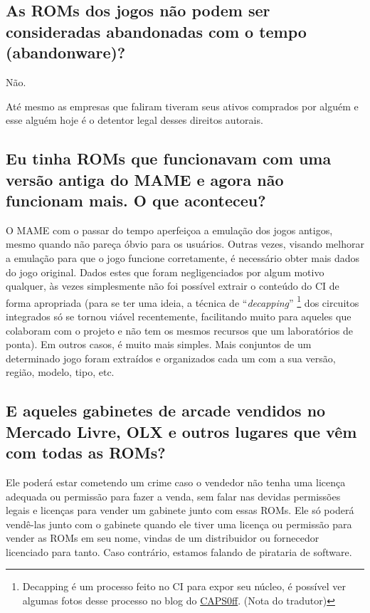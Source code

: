 \documentclass[letterpaper,10pt,brazil]{sphinxmanual}
\begin{document}
\subsection{As ROMs dos jogos não podem ser consideradas abandonadas com o tempo (abandonware)?}
\label{usingmame/commonissues:as-roms-dos-jogos-nao-podem-ser-consideradas-abandonadas-com-o-tempo-abandonware}\label{usingmame/commonissues:abandonware}
Não.

Até mesmo as empresas que faliram tiveram seus ativos comprados por
alguém e esse alguém hoje é o detentor legal desses direitos autorais.


\subsection{Eu tinha ROMs que funcionavam com uma versão antiga do MAME e agora não funcionam mais. O que aconteceu?}
\label{usingmame/commonissues:old-sets}\label{usingmame/commonissues:eu-tinha-roms-que-funcionavam-com-uma-versao-antiga-do-mame-e-agora-nao-funcionam-mais-o-que-aconteceu}
O MAME com o passar do tempo aperfeiçoa a emulação dos jogos antigos,
mesmo quando não pareça óbvio para os usuários. Outras vezes, visando
melhorar a emulação para que o jogo funcione corretamente, é necessário
obter mais dados do jogo original. Dados estes que foram negligenciados
por algum motivo qualquer, às vezes simplesmente não foi possível
extrair o conteúdo do CI de forma apropriada (para se ter uma ideia,
a técnica de ``\emph{decapping}'' \footnote[1]{\sphinxAtStartFootnote%
Decapping é um processo feito no CI para expor seu núcleo, é
possível ver algumas fotos desse processo no blog do \href{http://caps0ff.blogspot.com}{CAPS0ff}. (Nota do tradutor)
} dos circuitos integrados só se tornou
viável recentemente, facilitando muito para aqueles que colaboram com o
projeto e não tem os mesmos recursos que um laboratórios de ponta).
Em outros casos, é muito mais simples.
Mais conjuntos de um determinado jogo foram extraídos e organizados cada
um com a sua versão, região, modelo, tipo, etc.


\subsection{E aqueles gabinetes de arcade vendidos no Mercado Livre, OLX e outros lugares que vêm com todas as ROMs?}
\label{usingmame/commonissues:ebay-cabs}\label{usingmame/commonissues:e-aqueles-gabinetes-de-arcade-vendidos-no-mercado-livre-olx-e-outros-lugares-que-vem-com-todas-as-roms}
Ele poderá estar cometendo um crime caso o vendedor não tenha uma
licença adequada ou permissão para fazer a venda, sem falar nas
devidas permissões legais e licenças para vender um gabinete junto com
essas ROMs. Ele só poderá vendê-las junto com o gabinete quando ele
tiver uma licença ou permissão para vender as ROMs em seu nome, vindas
de um distribuidor ou fornecedor licenciado para tanto.
Caso contrário, estamos falando de pirataria de software.
\end{document}
